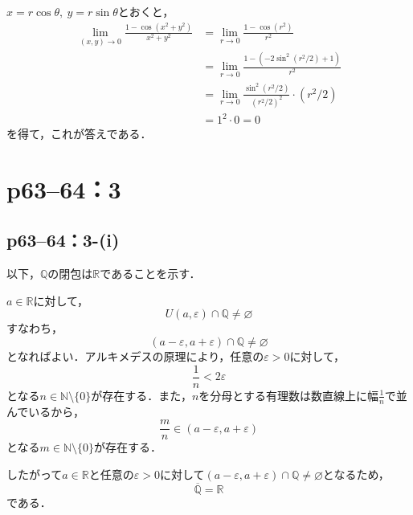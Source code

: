 \documentclass[a4paper,10pt,fleqn]{ltjsarticle}
\begin{document}
\begin{tleftbar}
    $x=r \cos \theta,~y=r\sin \theta$とおくと，
    \begin{align*}
        \lim_{(x,y)\to 0} \frac{1-\cos (x^2+y^2)}{x^2+y^2} & = \lim_{r \to 0} \frac{1-\cos (r^2)}{r^2}                       \\
                                                           & =\lim_{r \to 0} \frac{1-(-2\sin ^2 (r^2/2)+1)}{r^2}             \\
                                                           & =\lim_{r \to 0} \frac{\sin ^2 (r^2/2)}{(r^2/2)^2} \cdot (r^2/2) \\
                                                           & = 1^2 \cdot 0 =0
    \end{align*}
    を得て，これが答えである．
\end{tleftbar}


\section*{p63--64：3}


\subsection*{p63--64：3-(i)}

\begin{tleftbar}
    以下，$\mathbb{Q}$の閉包は$\mathbb{R}$であることを示す．

    $a \in \mathbb{R}$に対して，
    \[
        U(a,\varepsilon) \cap \mathbb{Q} \ne \varnothing
    \]
    すなわち，
    \[
        (a-\varepsilon,a+\varepsilon) \cap \mathbb{Q} \ne \varnothing
    \]
    となればよい．アルキメデスの原理により，任意の$\varepsilon >0$に対して，
    \[
        \frac{1}{n}< 2\varepsilon
    \]
    となる$n \in \mathbb{N} \setminus \{0\}$が存在する．また，$n$を分母とする有理数は数直線上に幅$\frac{1}{n}$で並んでいるから，
    \[
        \frac{m}{n} \in (a-\varepsilon,a+\varepsilon)
    \]
    となる$ m \in \mathbb{N} \setminus \{0\}$が存在する．\par
    したがって$a \in \mathbb{R}$と任意の$\varepsilon>0$に対して$(a-\varepsilon,a+\varepsilon) \cap \mathbb{Q} \ne \varnothing$となるため，
    \[
        \overline{\mathbb{Q}}=\mathbb{R}
    \]
    である．
\end{tleftbar}
\end{document}

